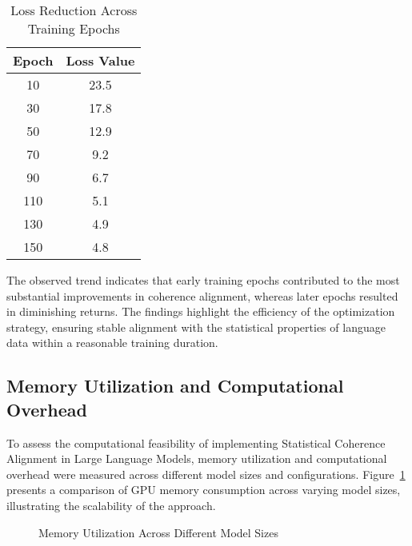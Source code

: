 \documentclass{article}
\begin{document}
\begin{table}[h]
	\centering
	\caption{Loss Reduction Across Training Epochs}
	\label{tab:convergence}
	\renewcommand{\arraystretch}{1.2}
	\setlength{\arrayrulewidth}{0.4mm}
	\setlength{\tabcolsep}{8pt}
		\begin{tabular}{|c|c|}
			\hline
			\textbf{Epoch} & \textbf{Loss Value} \\
			\hline
			10  & 23.5  \\
			30  & 17.8  \\
			50  & 12.9  \\
			70  & 9.2   \\
			90  & 6.7   \\
			110 & 5.1   \\
			130 & 4.9   \\
			150 & 4.8   \\
			\hline
		\end{tabular}
\end{table}

The observed trend indicates that early training epochs contributed to the most substantial improvements in coherence alignment, whereas later epochs resulted in diminishing returns. The findings highlight the efficiency of the optimization strategy, ensuring stable alignment with the statistical properties of language data within a reasonable training duration.

\subsection{Memory Utilization and Computational Overhead}

To assess the computational feasibility of implementing Statistical Coherence Alignment in Large Language Models, memory utilization and computational overhead were measured across different model sizes and configurations. Figure~\ref{fig:memory_usage} presents a comparison of GPU memory consumption across varying model sizes, illustrating the scalability of the approach. 

\begin{figure}[h]
	\centering
	\caption{Memory Utilization Across Different Model Sizes}
	\label{fig:memory_usage}
\end{figure}
\end{document}
